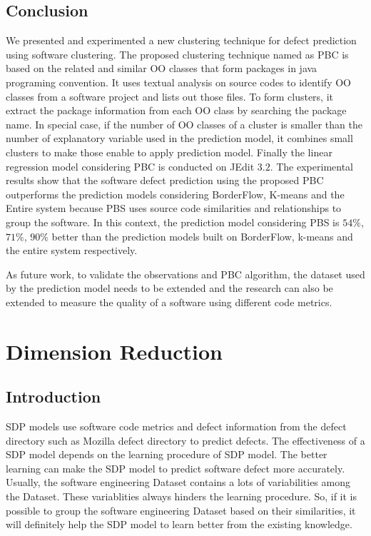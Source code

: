 \documentclass[12pt]{report}
\begin{document}
\section{Conclusion}

We presented and experimented a new clustering technique for defect prediction using software clustering. The proposed clustering technique named as PBC is based on the related and similar OO classes that form packages in java programing convention. It uses textual analysis on source codes to identify OO classes from a software project and lists out those files. To form clusters, it extract the package information from each OO class by searching the package name. In special case, if the number of OO classes of a cluster is smaller than the number of explanatory variable used in the prediction model, it combines small clusters to make those enable to apply prediction model. Finally the linear regression model considering PBC is conducted on JEdit $3.2$. The experimental results show that the software defect prediction using the proposed PBC outperforms the prediction models considering BorderFlow, K-means and the Entire system because PBS uses source code similarities and relationships to group the software. In this context, the prediction model considering PBS is  $54\%$, $71\%$, $90\%$ better than the prediction models built on BorderFlow, k-means and the entire system respectively. 

As future work, to validate the observations and PBC algorithm, the dataset used by the prediction model needs to be extended and the research can also be extended to measure the quality of a software using different code metrics.  

\chapter{Dimension Reduction}
\section{Introduction}
SDP models use software code metrics and defect information from the defect directory such as Mozilla defect directory \cite{BugzillaforMozilla} to predict defects. The effectiveness of a SDP model depends on the learning procedure of SDP model. The better learning can make the SDP model to predict software defect more accurately. Usually, the software engineering Dataset contains a lots of variabilities among the Dataset. These variablities always hinders the learning procedure. So, if it is possible to group the software engineering Dataset based on their similarities, it will definitely help the SDP model to learn better from the existing knowledge.
\end{document}
